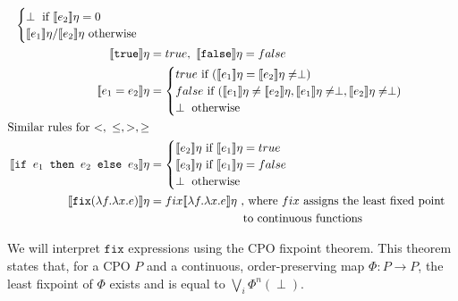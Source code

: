 \begin{align*}
  \begin{cases}
  \perp \text{ if }  \llbracket e_2 \rrbracket\eta = 0 \\
   \llbracket e_1 \rrbracket\eta / \llbracket e_2 \rrbracket\eta \text{ otherwise}
   \end{cases} \\
  \llbracket \texttt{true} \rrbracket\eta &= true, \ \llbracket \texttt{false} \rrbracket\eta = false \\
 \llbracket e_1 = e_2 \rrbracket\eta &= 
 \begin{cases} 
      true \text{ if } (\llbracket e_1 \rrbracket\eta = \llbracket e_2 \rrbracket\eta \neq \perp) \\
      false \text{  if } (\llbracket e_1 \rrbracket\eta \neq \llbracket e_2\rrbracket\eta, \llbracket e_1 \rrbracket\eta \neq \perp, \llbracket e_2 \rrbracket\eta \neq \perp)\\
      \perp \text{ otherwise}
   \end{cases} \\
\text{Similar rules for $<, \ \leq, >, \geq$} \\
  \llbracket \texttt{if } e_1 \texttt{ then } e_2 \texttt{ else } e_3 \rrbracket \eta &= 
 \begin{cases} 
      \llbracket e_2 \rrbracket\eta \text{ if } \llbracket e_1 \rrbracket\eta = true \\
      \llbracket e_3 \rrbracket\eta \text{ if } \llbracket e_1 \rrbracket\eta = false \\
      \perp \text{      otherwise} \\
   \end{cases}
  \\
   \llbracket  \texttt{fix} (\lambda f.\lambda x.e) \rrbracket\eta &= fix\llbracket \lambda f.\lambda x.e \rrbracket\eta \
 \text{, where } fix \text{ assigns the least fixed point} \\ 
 &\text{ \ \ \ \ \ \ \ \ \ \ \ \ \ \ \ \ \ \ \ \ \ \ \ to continuous functions} \\
 \end{align*}
 
 We will interpret $\texttt{fix}$ expressions using the CPO fixpoint theorem. This theorem states that, for a CPO $P$ and a continuous, order-preserving map $\Phi : P \rightarrow P$, the least fixpoint of $\Phi$ exists and is equal to $\bigvee_i \Phi^n(\perp)$.

